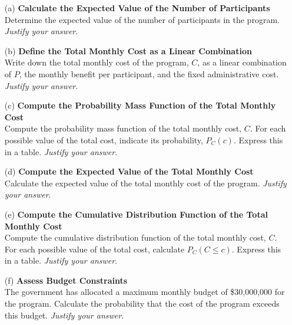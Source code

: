 \documentclass{article}
\newcommand{\blankbox}[2][3cm]{%
    \vspace{-0.5em}
    \begin{figure}[H]
        \makebox[\linewidth]{%
            \begin{tcolorbox}[
                colback=white, 
                colframe=black, 
                width=#2, %
                height=#1,
                boxrule=0.2mm
            ]
            \end{tcolorbox}
        }
    \end{figure}
    \vspace{-1em}
}
\begin{document}
\begin{itemize}
    \item[(a)] \textbf{Calculate the Expected Value of the Number of Participants} \\
    Determine the expected value of the number of participants in the program. \emph{Justify your answer}.
    \blankbox[5cm]{1.1\textwidth}
        
    \item[(b)] \textbf{Define the Total Monthly Cost as a Linear Combination} \\
    Write down the total monthly cost of the program, $C$, as a linear combination of $P$, the monthly benefit per participant, and the fixed administrative cost. \emph{Justify your answer}.
    \blankbox[5cm]{1.1\textwidth}
        
    \item[(c)] \textbf{Compute the Probability Mass Function of the Total Monthly Cost} \\
    Compute the probability mass function of the total monthly cost, $C$. For each possible value of the total cost, indicate its probability, $P_C(c)$. Express this in a table. \emph{Justify your answer}.
    \blankbox[5cm]{1.1\textwidth}
        
    \item[(d)] \textbf{Compute the Expected Value of the Total Monthly Cost} \\
    Calculate the expected value of the total monthly cost of the program. \emph{Justify your answer}.
    \blankbox[5cm]{1.1\textwidth}
        
    \item[(e)] \textbf{Compute the Cumulative Distribution Function of the Total Monthly Cost} \\
    Compute the cumulative distribution function of the total monthly cost, $C$. For each possible value of the total cost, calculate $P_C(C \leq c)$. Express this in a table. \emph{Justify your answer}.
    \blankbox[5cm]{1.1\textwidth}
        
    \item[(f)] \textbf{Assess Budget Constraints} \\
    The government has allocated a maximum monthly budget of \$30,000,000 for the program. Calculate the probability that the cost of the program exceeds this budget. \emph{Justify your answer}.
    \blankbox[5cm]{1.1\textwidth}

\end{itemize}
\end{document}
